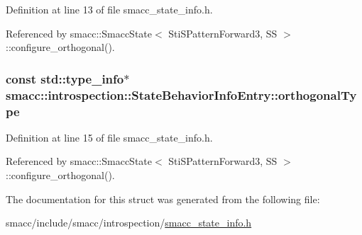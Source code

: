 Definition at line 13 of file smacc\+\_\+state\+\_\+info.\+h.



Referenced by smacc\+::\+Smacc\+State$<$ Sti\+S\+Pattern\+Forward3, S\+S $>$\+::configure\+\_\+orthogonal().

\subsubsection[{\texorpdfstring{orthogonal\+Type}{orthogonalType}}]{\setlength{\rightskip}{0pt plus 5cm}const std\+::type\+\_\+info$\ast$ smacc\+::introspection\+::\+State\+Behavior\+Info\+Entry\+::orthogonal\+Type}\hypertarget{structsmacc_1_1introspection_1_1StateBehaviorInfoEntry_aafb02bbfd8a479d586039b3971dfe7e0}{}\label{structsmacc_1_1introspection_1_1StateBehaviorInfoEntry_aafb02bbfd8a479d586039b3971dfe7e0}


Definition at line 15 of file smacc\+\_\+state\+\_\+info.\+h.



Referenced by smacc\+::\+Smacc\+State$<$ Sti\+S\+Pattern\+Forward3, S\+S $>$\+::configure\+\_\+orthogonal().



The documentation for this struct was generated from the following file\+:\begin{DoxyCompactItemize}
\item 
smacc/include/smacc/introspection/\hyperlink{smacc__state__info_8h}{smacc\+\_\+state\+\_\+info.\+h}\end{DoxyCompactItemize}

